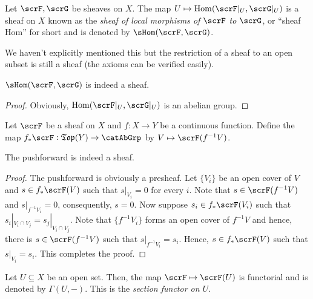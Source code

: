 \begin{definition}
    Let $\scrF, \scrG$ be sheaves on $X$. The map $U\mapsto\Hom(\scrF|_U,\scrG|_U)$ is a sheaf on $X$ known as the \emph{sheaf of local morphisms of $\scrF$ to $\scrG$}, or ``sheaf Hom'' for short and is denoted by $\sHom(\scrF,\scrG)$.
\end{definition}
\begin{remark}
    We haven't explicitly mentioned this but the restriction of a sheaf to an open subset is still a sheaf (the axioms can be verified easily).
\end{remark}

\begin{proposition}
    $\sHom(\scrF, \scrG)$ is indeed a sheaf.
\end{proposition}
\begin{proof}
    Obviously, $\Hom(\scrF|_U,\scrG|_U)$ is an abelian group.
\end{proof}

\begin{definition}[Pushforward]
    Let $\scrF$ be a sheaf on $X$ and $f: X\to Y$ be a continuous function. Define the map $f_\ast\scrF:\mathfrak{Top}(Y)\to\catAbGrp$ by $V\mapsto\scrF(f^{-1}V)$.
\end{definition}

\begin{proposition}
    The pushforward is indeed a sheaf.
\end{proposition}
\begin{proof}
    The pushforward is obviously a presheaf. Let $\{V_i\}$ be an open cover of $V$ and $s\in f_\ast\scrF(V)$ such that $s|_{V_i} = 0$ for every $i$. Note that $s\in\scrF(f^{-1}V)$ and $s|_{f^{-1}V_i} = 0$, consequently, $s = 0$. Now suppose $s_i\in f_\ast\scrF(V_i)$ such that $s_i|_{V_i\cap V_j} = s_j|_{V_i\cap V_j}$. Note that $\{f^{-1}V_i\}$ forms an open cover of $f^{-1}V$ and hence, there is $s\in\scrF(f^{-1}V)$ such that $s|_{f^{-1}V_i} = s_i$. Hence, $s\in f_\ast\scrF(V)$ such that $s|_{V_i} = s_i$. This completes the proof.
\end{proof}

\begin{definition}
    Let $U\subseteq X$ be an open set. Then, the map $\scrF\mapsto\scrF(U)$ is functorial and is denoted by $\Gamma(U,-)$. This is the \emph{section functor on $U$}.
\end{definition}

